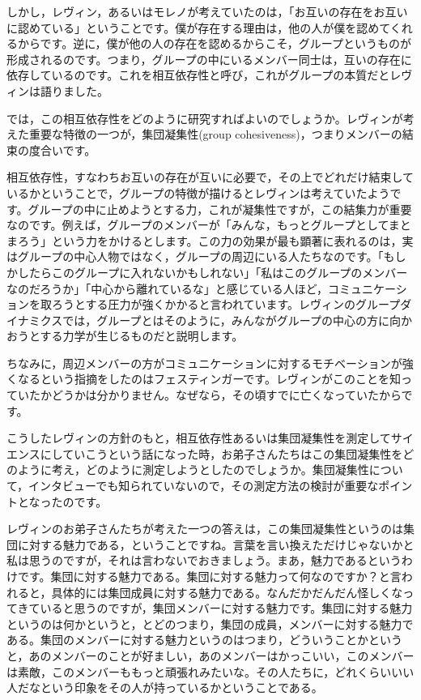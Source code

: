 \documentclass{ltjsbook}
\begin{document}
しかし，レヴィン，あるいはモレノが考えていたのは，「お互いの存在をお互いに認めている」ということです。僕が存在する理由は，他の人が僕を認めてくれるからです。逆に，僕が他の人の存在を認めるからこそ，グループというものが形成されるのです。つまり，グループの中にいるメンバー同士は，互いの存在に依存しているのです。これを相互依存性と呼び，これがグループの本質だとレヴィンは語りました。

では，この相互依存性をどのように研究すればよいのでしょうか。レヴィンが考えた重要な特徴の一つが，集団凝集性(group cohesiveness)，つまりメンバーの結束の度合いです。

相互依存性，すなわちお互いの存在が互いに必要で，その上でどれだけ結束しているかということで，グループの特徴が描けるとレヴィンは考えていたようです。グループの中に止めようとする力，これが凝集性ですが，この結集力が重要なのです。例えば，グループのメンバーが「みんな，もっとグループとしてまとまろう」という力をかけるとします。この力の効果が最も顕著に表れるのは，実はグループの中心人物ではなく，グループの周辺にいる人たちなのです。「もしかしたらこのグループに入れないかもしれない」「私はこのグループのメンバーなのだろうか」「中心から離れているな」と感じている人ほど，コミュニケーションを取ろうとする圧力が強くかかると言われています。レヴィンのグループダイナミクスでは，グループとはそのように，みんながグループの中心の方に向かおうとする力学が生じるものだと説明します。

ちなみに，周辺メンバーの方がコミュニケーションに対するモチベーションが強くなるという指摘をしたのはフェスティンガーです。レヴィンがこのことを知っていたかどうかは分かりません。なぜなら，その頃すでに亡くなっていたからです。

こうしたレヴィンの方針のもと，相互依存性あるいは集団凝集性を測定してサイエンスにしていこうという話になった時，お弟子さんたちはこの集団凝集性をどのように考え，どのように測定しようとしたのでしょうか。集団凝集性について，インタビューでも知られていないので，その測定方法の検討が重要なポイントとなったのです。

レヴィンのお弟子さんたちが考えた一つの答えは，この集団凝集性というのは集団に対する魅力である，ということですね。言葉を言い換えただけじゃないかと私は思うのですが，それは言わないでおきましょう。まあ，魅力であるというわけです。集団に対する魅力である。集団に対する魅力って何なのですか？と言われると，具体的には集団成員に対する魅力である。なんだかだんだん怪しくなってきていると思うのですが，集団メンバーに対する魅力です。集団に対する魅力というのは何かというと，とどのつまり，集団の成員，メンバーに対する魅力である。集団のメンバーに対する魅力というのはつまり，どういうことかというと，あのメンバーのことが好ましい，あのメンバーはかっこいい，このメンバーは素敵，このメンバーももっと頑張れみたいな。その人たちに，どれくらいいい人だなという印象をその人が持っているかということである。
\end{document}
